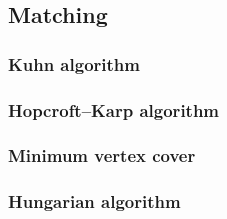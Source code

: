 \subsection{Matching}
  \subsubsection{Kuhn algorithm}
  \subsubsection{Hopcroft–Karp algorithm}
  \subsubsection{Minimum vertex cover}
  \subsubsection{Hungarian algorithm}

